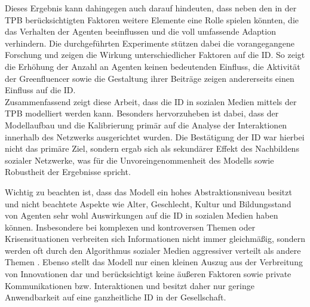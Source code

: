\documentclass[runningheads]{llncs}
\begin{document}
Dieses Ergebnis kann dahingegen auch darauf hindeuten, dass neben den in der TPB berücksichtigten Faktoren weitere Elemente eine Rolle spielen könnten, die das Verhalten der Agenten beeinflussen und die voll umfassende Adaption verhindern. 
Die durchgeführten Experimente stützen dabei die vorangegangene Forschung und zeigen die Wirkung unterschiedlicher Faktoren auf die ID. So zeigt die Erhöhung der Anzahl an Agenten keinen bedeutenden Einfluss, die Aktivität der Greenfluencer sowie die Gestaltung ihrer Beiträge zeigen andererseits einen Einfluss auf die ID. \\
\indent
Zusammenfassend zeigt diese Arbeit, dass die ID in sozialen Medien mittels der TPB modelliert werden kann. Besonders hervorzuheben ist dabei, dass der Modellaufbau und die Kalibrierung primär auf die Analyse der Interaktionen innerhalb des Netzwerks ausgerichtet wurden. Die Bestätigung der ID war hierbei nicht das primäre Ziel, sondern ergab sich als sekundärer Effekt des Nachbildens sozialer Netzwerke, was für die Unvoreingenommenheit des Modells sowie Robustheit der Ergebnisse spricht.

Wichtig zu beachten ist, dass das Modell ein hohes Abstraktionsniveau besitzt und nicht beachtete Aspekte wie Alter, Geschlecht, Kultur und Bildungsstand von Agenten sehr wohl Auswirkungen auf die ID in sozialen Medien haben können.
Insbesondere bei komplexen und kontroversen Themen oder Krisensituationen verbreiten sich Informationen nicht immer gleichmäßig, sondern werden oft durch den Algorithmus sozialer Medien aggressiver verteilt als andere Themen \cite{jiang_building_2021}. 
Ebenso stellt das Modell nur einen kleinen Auszug aus der Verbreitung von Innovationen dar und berücksichtigt keine äußeren Faktoren sowie private Kommunikationen bzw. Interaktionen und besitzt daher nur geringe Anwendbarkeit auf eine ganzheitliche ID in der Gesellschaft. 
\end{document}
